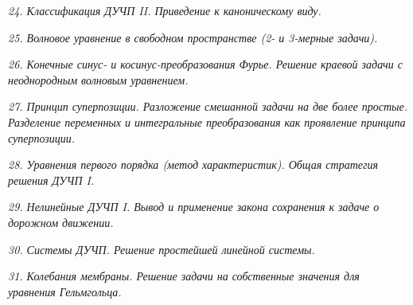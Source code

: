 \newpage %

\emph{24. Классификация ДУЧП II. Приведение к каноническому виду.}

\newpage %

\emph{25. Волновое уравнение в свободном пространстве (2- и 3-мерные задачи).}

\newpage %

\emph{26. Конечные синус- и косинус-преобразования Фурье. Решение краевой задачи
с неоднородным волновым уравнением.}

\newpage %

\emph{27. Принцип суперпозиции. Разложение смешанной задачи на две более
простые. Разделение переменных и интегральные преобразования как проявление
принципа суперпозиции.}

\newpage %

\emph{28. Уравнения первого порядка (метод характеристик). Общая стратегия
решения ДУЧП I.}

\newpage %

\emph{29. Нелинейные ДУЧП I. Вывод и применение закона сохранения к задаче о
дорожном движении.}

\newpage %

\emph{30. Системы ДУЧП. Решение простейшей линейной системы.}

\newpage %

\emph{31. Колебания мембраны. Решение задачи на собственные значения для
уравнения Гельмгольца.}



